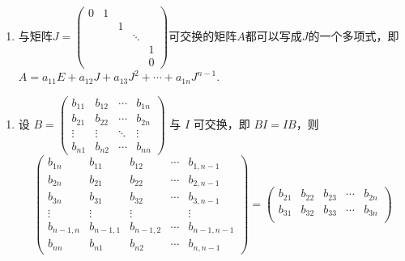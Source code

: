 \begin{exercise}
\begin{exgroup}
\begin{enumerate}
            \item 与矩阵$J=\begin{pmatrix}
                          0 & 1 &   &        &   \\
                            &   & 1 &        &   \\
                            &   &   & \ddots &   \\
                            &   &   &        & 1 \\
                            &   &   &        & 0
                      \end{pmatrix}$可交换的矩阵$A$都可以写成$J$的一个多项式，即$A=a_{11}E+a_{12}J+a_{13}J^2+\cdots+a_{1n}J^{n-1}$.
        \end{enumerate}
        \begin{answer}
            \begin{enumerate}
                \item 设 $B = \begin{pmatrix}
                        b_{11} & b_{12} & \cdots & b_{1n} \\
                        b_{21} & b_{22} & \cdots & b_{2n} \\
                        \vdots & \vdots & \ddots & \vdots \\
                        b_{n1} & b_{n2} & \cdots & b_{nn}
                    \end{pmatrix}$ 与 $I$ 可交换，即 $BI=IB$，则
                    \[
                        \begin{pmatrix}
                            b_{1n} & b_{11} & b_{12} & \cdots & b_{1,n-1} \\
                            b_{2n} & b_{21} & b_{22} & \cdots & b_{2,n-1} \\
                            b_{3n} & b_{31} & b_{32} & \cdots & b_{3,n-1} \\
                            \vdots & \vdots & \vdots &        & \vdots    \\
                            b_{n-1,n} & b_{n-1,1} & b_{n-1,2} & \cdots & b_{n-1,n-1} \\
                            b_{nn} & b_{n1} & b_{n2} & \cdots & b_{n,n-1}
                        \end{pmatrix} = \begin{pmatrix}
                            b_{21} & b_{22} & b_{23} & \cdots & b_{2n} \\
                            b_{31} & b_{32} & b_{33} & \cdots & b_{3n} \\

\end{pmatrix}\]
\end{enumerate}
\end{answer}
\end{exgroup}
\end{exercise}
